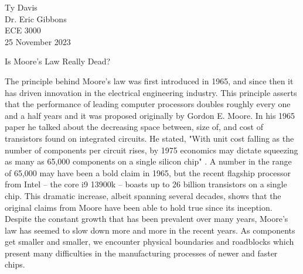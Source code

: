 \documentclass[12pt]{article}
\begin{document}
\begin{flushleft}

Ty Davis\\
Dr. Eric Gibbons\\
ECE 3000\\
25 November 2023\\


\begin{center}
Is Moore's Law Really Dead?
\end{center}



\setlength{\parindent}{0.5in}

The principle behind Moore's law was first introduced
in 1965, and since then it has driven innovation in
the electrical engineering industry. This principle
asserts that the performance of leading computer processors
doubles roughly every one and a half years and it was
proposed originally by Gordon E. Moore. In his 1965
paper he talked about the decreasing space between,
size of, and cost of transistors found on integrated
circuits. He stated, "With unit cost falling as the
number of components per circuit rises, by 1975 economics
may dictate squeezing as many as 65,000 components
on a single silicon chip" \parencite{4785860}. A number
in the range of 65,000 may have been a bold claim in
1965, but the recent flagship processor from Intel
-- the core i9 13900k -- boasts up to 26 billion transistors
on a single chip. This dramatic increase, albeit spanning
several decades, shows that the original claims from
Moore have been able to hold true since its inception.
Despite the constant growth that has been prevalent
over many years, Moore's law has seemed to slow down
more and more in the recent years. As components get
smaller and smaller, we encounter physical boundaries
and roadblocks which present many difficulties in
the manufacturing processes of newer and faster chips.


\end{flushleft}
\end{document}
